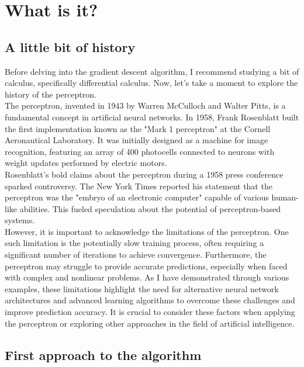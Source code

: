 


\section{What is it?}
\subsection{A little bit of history}
Before delving into the gradient descent algorithm, I recommend studying a bit of calculus,
specifically differential calculus. Now, let's take a moment to explore the history of the perceptron.\\

The perceptron, invented in 1943 by Warren McCulloch and Walter Pitts, is a fundamental concept in
artificial neural networks. In 1958, Frank Rosenblatt built the first implementation known as the "Mark 1
perceptron" at the Cornell Aeronautical Laboratory. It was initially designed as a machine for image recognition,
featuring an array of 400 photocells connected to neurons with weight updates performed by electric motors.\\

Rosenblatt's bold claims about the perceptron during a 1958 press conference sparked controversy.
The New York Times reported his statement that the perceptron was the "embryo of an electronic computer"
capable of various human-like abilities. This fueled speculation about the potential of perceptron-based
systems.\\

However, it is important to acknowledge the limitations of the perceptron. One such limitation is the
potentially slow training process, often requiring a significant number of iterations to achieve convergence.
Furthermore, the perceptron may struggle to provide accurate predictions, especially when faced with complex and
nonlinear problems. As I have demonstrated through various examples, these limitations highlight the need for
alternative neural network architectures and advanced learning algorithms to overcome these challenges and
improve prediction accuracy. It is crucial to consider these factors when applying the perceptron or exploring
other approaches in the field of artificial intelligence.

\subsection{First approach to the algorithm}
